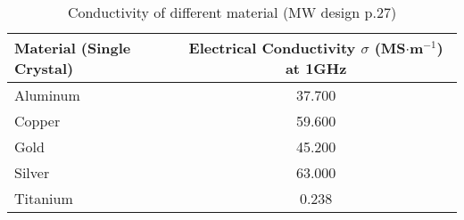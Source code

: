\begin{table}
\caption{Conductivity of different material (MW design p.27)}
\begin{tabular}{l|c}
\toprule
Material (Single Crystal) & \makecell{Electrical Conductivity\\$\sigma$ (MS$\cdot$m$^{-1}$) at 1GHz} \\
\midrule
\hline
Aluminum & 37.700 \\
Copper & 59.600 \\
Gold & 45.200 \\
Silver & 63.000 \\
Titanium & 0.238 \\
\bottomrule
\end{tabular}
\end{table}